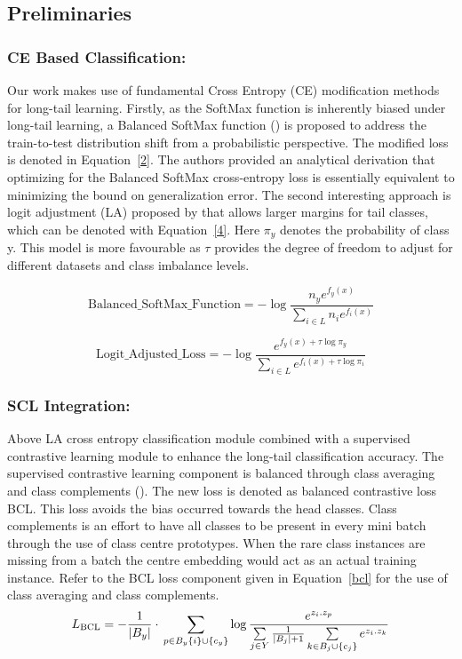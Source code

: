 \subsection{Preliminaries}
\label{l1}
\subsubsection{ CE Based Classification:} Our work makes use of fundamental Cross Entropy (CE) modification methods for long-tail learning. Firstly, as the SoftMax function is inherently biased under long-tail learning, a Balanced SoftMax function (\cite{metasoftmax}) is proposed to address the train-to-test distribution shift from a probabilistic perspective. The modified loss is denoted in Equation~\ref{2}. The authors provided an analytical derivation that optimizing for the Balanced SoftMax cross-entropy loss is essentially equivalent to minimizing the bound on generalization error. The second interesting approach is logit adjustment (LA) proposed by \cite{menon2020long} that allows larger margins for tail classes, which can be denoted with Equation~\ref{4}. Here $\pi_y$ denotes the probability of class y. This model is more favourable as $\tau$ provides the degree of freedom to adjust for different datasets and class imbalance levels.

\begin{equation}
\text{Balanced\_SoftMax\_Function} = - \log \frac{n_y e^{f_y(x)}}{\sum_{i \in L} n_i e^{f_i(x)}}
\label{2}
\end{equation}

\begin{equation}
\text{Logit\_Adjusted\_Loss}= - \log \frac{ e^{f_y(x)+\tau\log{\pi_y}}}{\sum_{i \in L}  e^{f_i(x)+\tau\log{\pi_i}}}
\label{4}
\end{equation}

 \subsubsection{ SCL Integration:} Above LA cross entropy classification module combined with a supervised contrastive learning module to enhance the long-tail classification accuracy. The supervised contrastive learning component is balanced through class averaging and class complements (\cite{bcl}). The new loss is denoted as balanced contrastive loss BCL. This loss avoids the bias occurred towards the head classes. Class complements is an effort to have all classes to be present in every mini batch through the use of class centre prototypes. When the rare class instances are missing from a batch the centre embedding would act as an actual training instance. Refer to the BCL loss component given in Equation~\ref{bcl} for the use 
of class averaging and class complements.
\begin{equation}
L_{\text{BCL}}=-\frac{1}{|B_y|} \cdot \\ \sum\limits_{p\in {B_y \{i\}} \cup \{c_y\}}\log \frac{e^{z_i.z_p}}{\sum\limits_{j\in Y}\frac{1}{|B_j|+1}\sum\limits_{k \in B_j \cup \{c_j\}} e^{z_i.z_k}}
\label{bcl}
\end{equation}

